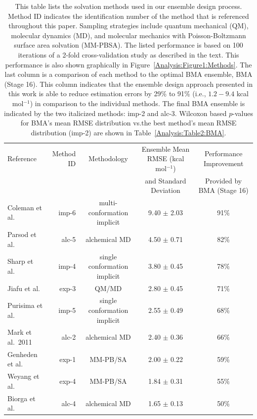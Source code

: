 \documentclass[journal=jpcbfk, manuscript=article]{achemso}
\newcommand{\+}[1]{\ensuremath{\mathbf{#1}}}
\begin{document}
\begin{table}[t]
	\centering
	\caption[Ensemble Constituents]{This table lists the solvation methods used in our ensemble design process.
	Method ID indicates the identification number of the method that is referenced throughout this paper.
	Sampling strategies include quantum mechanical (QM), molecular dynamics (MD), and molecular mechanics with Poisson-Boltzmann surface area solvation (MM-PBSA).
	The listed performance is based on 100 iterations of a 2-fold cross-validation study as described in the text.
	This performance is also shown graphically in Figure~\ref{Analysis:Figure1:Methods}.
	The last column is a comparison of each method to the optimal BMA ensemble, BMA (Stage 16).
	This column indicates that the ensemble design approach presented in this work is able to reduce estimation errors by 29\% to 91\% (i.e., $1.2 - 9.4$ kcal mol$^{-1}$) in comparison to the individual methods.
	The final BMA ensemble is indicated by the two italicized methods: imp-2 and alc-3.
	Wilcoxon based $p$-values for BMA's mean RMSE distribution vs.\@ the best method's mean RMSE distribution (imp-2) are shown in Table~\ref{Analysis:Table2:BMA}.}
	\scriptsize
	\begin{tabular}{l|r|c|c|c}
		\hline
		\hline
		Reference & Method ID & Methodology & Ensemble Mean RMSE (kcal mol$^{-1}$) & Performance Improvement \\
		& & & and Standard Deviation & Provided by BMA (Stage 16)\\
		\hline
		Coleman et al.~\cite{Coleman:2014} & imp-6  & multi-conformation implicit & 9.40 $\pm$ 2.03 & 91\% \\
		Parsod et al. & alc-5 &  alchemical MD & 4.50 $\pm$ 0.71 & 82\% \\ 
		Sharp et al.~\cite{Yang:2006} & imp-4 & single conformation implicit & 3.80 $\pm$ 0.45 & 78\% \\
		Jiafu et al. & exp-3 & QM/MD & 2.80 $\pm$ 0.45 & 71\% \\
		Purisima et al.~\cite{Hogues:2014} & imp-5  & single conformation implicit & 2.55 $\pm$ 0.49 & 68\%\\
		Mark et al.~2011 & alc-2 & alchemical MD & 2.40 $\pm$ 0.36 & 66\%\\ 
		Genheden et al.~\cite{Genheden:2014} & exp-1  & MM-PB/SA & 2.00 $\pm$ 0.22 & 59\%\\
		Weyang et al. & exp-4  & MM-PB/SA & 1.84 $\pm$ 0.31 & 55\%\\		
		Biorga et al.~\cite{Beckstein:2012,Beckstein:2014} & alc-4  & alchemical MD & 1.65 $\pm$ 0.13 & 50\%\\ 

\end{tabular}
\end{table}
\end{document}

